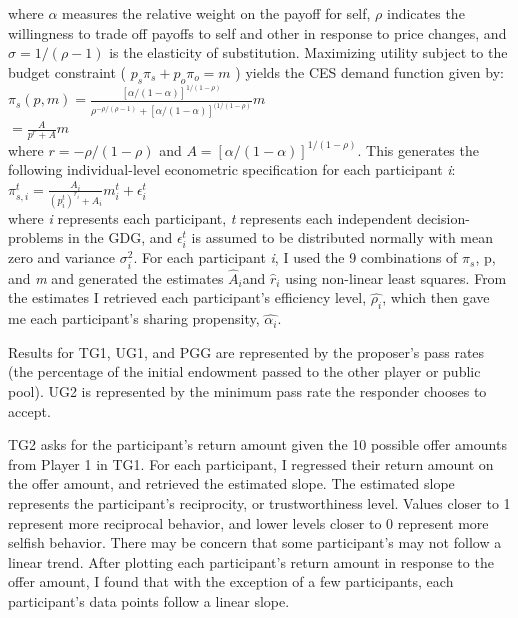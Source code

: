 \documentclass[12pt]{article}
\begin{document}
\noindent
where \(\alpha\) measures the relative weight on the payoff for self, \(\rho\) indicates the willingness to trade off payoffs to self and other in response to price changes, and \(\sigma = 1/(\rho - 1) \) is the elasticity of substitution. Maximizing utility subject to the budget constraint ( \(p_{s}\pi_{s} + p_{o}\pi_{o}=m\) ) yields the CES demand function given by: \\
 
\(\pi_{s}(p,m)=\frac{[\alpha/(1-\alpha)]^{1/(1-\rho)}}{\rho^{-\rho/(\rho-1)}+[\alpha/(1-\alpha)]^{(1/(1-\rho)}}m\) \\

\hspace{15mm} \(= \frac{A}{p^{r}+A}m \) \\
 
 \noindent
where \(r=-\rho / (1-\rho) \) and \(A=[\alpha / (1-\alpha)]^{1/(1-\rho)} \). This generates the following individual-level econometric specification for each participant \textit{i}: \\
 
\( \pi^{t}_{s,i} = \frac{A_{i}}{(p^{t}_{i})^{r_{i}} + A_{i}}m^{t}_{i} + \epsilon^{t}_{i}\) \\
 
\noindent
where \textit{i} represents each participant, \textit{t} represents each independent decision-problems in the GDG, and \( \epsilon^{t}_{i} \) is assumed to be distributed normally with mean zero and variance \(\sigma^{2}_{i}\). For each participant \textit{i}, I used the 9 combinations of \(\pi_{s}\), p, and \textit{m} and generated the estimates \( \hat{A}_{i} \)and \( \hat{r}_{i} \) using non-linear least squares. From the estimates I retrieved each participant\rq s efficiency level, \( \hat{\rho_{i}}\), which then gave me each participant\rq s sharing propensity, \( \hat{\alpha_{i}} \).

Results for TG1, UG1, and PGG are represented by the proposer\rq s pass rates (the percentage of the initial endowment passed to the other player or public pool). UG2 is represented by the minimum pass rate the responder chooses to accept. 

TG2 asks for the participant\rq s return amount given the 10 possible offer amounts from Player 1 in TG1. For each participant, I regressed their return amount on the offer amount, and retrieved the estimated slope. The estimated slope represents the participant\rq s reciprocity, or trustworthiness level. Values closer to 1 represent more reciprocal behavior, and lower levels closer to 0 represent more selfish behavior. There may be concern that some participant\rq s may not follow a linear trend. After plotting each participant\rq s return amount in response to the offer amount, I found that with the exception of a few participants, each participant\rq s data points follow a linear slope.
\end{document}
